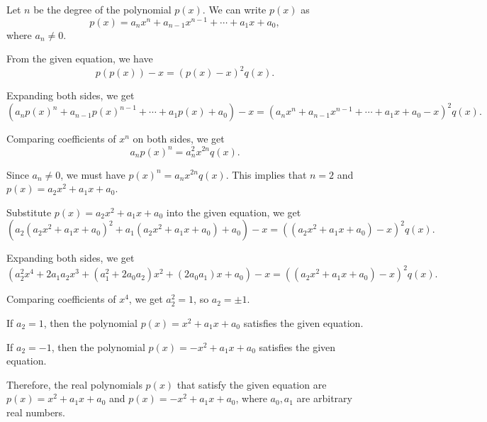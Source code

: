 Let \( n \) be the degree of the polynomial \( p(x) \). We can write \( p(x) \) as
\[
p(x) = a_n x^n + a_{n-1} x^{n-1} + \cdots + a_1 x + a_0,
\]
where \( a_n \neq 0 \).

From the given equation, we have
\[
p(p(x)) - x = (p(x) - x)^2 q(x).
\]

Expanding both sides, we get
\[
(a_n p(x)^n + a_{n-1} p(x)^{n-1} + \cdots + a_1 p(x) + a_0) - x = (a_n x^n + a_{n-1} x^{n-1} + \cdots + a_1 x + a_0 - x)^2 q(x).
\]

Comparing coefficients of \( x^n \) on both sides, we get
\[
a_n p(x)^n = a_n^2 x^{2n} q(x).
\]

Since \( a_n \neq 0 \), we must have \( p(x)^n = a_n x^{2n} q(x) \). This implies that \( n = 2 \) and \( p(x) = a_2 x^2 + a_1 x + a_0 \).

Substitute \( p(x) = a_2 x^2 + a_1 x + a_0 \) into the given equation, we get
\[
(a_2(a_2 x^2 + a_1 x + a_0)^2 + a_1(a_2 x^2 + a_1 x + a_0) + a_0) - x = ((a_2 x^2 + a_1 x + a_0) - x)^2 q(x).
\]

Expanding both sides, we get
\[
(a_2^2 x^4 + 2a_1 a_2 x^3 + (a_1^2 + 2a_0 a_2) x^2 + (2a_0 a_1) x + a_0) - x = ((a_2 x^2 + a_1 x + a_0) - x)^2 q(x).
\]

Comparing coefficients of \( x^4 \), we get \( a_2^2 = 1 \), so \( a_2 = \pm 1 \).

If \( a_2 = 1 \), then the polynomial \( p(x) = x^2 + a_1 x + a_0 \) satisfies the given equation.

If \( a_2 = -1 \), then the polynomial \( p(x) = -x^2 + a_1 x + a_0 \) satisfies the given equation.

Therefore, the real polynomials \( p(x) \) that satisfy the given equation are \( p(x) = x^2 + a_1 x + a_0 \) and \( p(x) = -x^2 + a_1 x + a_0 \), where \( a_0, a_1 \) are arbitrary real numbers.
